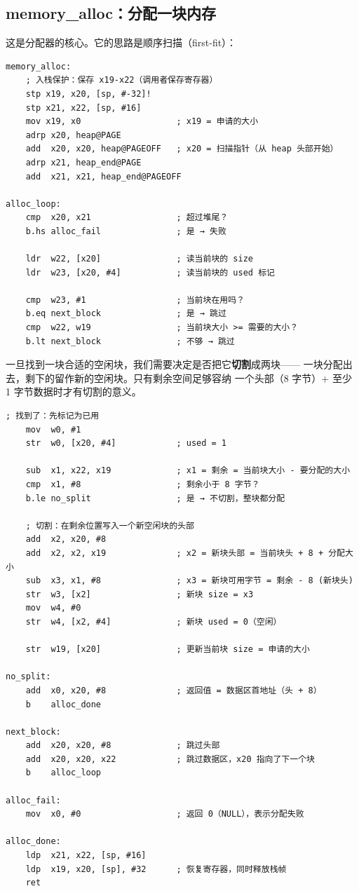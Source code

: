 \subsection{memory\_alloc：分配一块内存}

这是分配器的核心。它的思路是顺序扫描（first-fit）：

\begin{lstlisting}[style=asm,caption=memory.s — memory\_alloc（第一部分：扫描循环）]
memory_alloc:
    ; 入栈保护：保存 x19-x22（调用者保存寄存器）
    stp x19, x20, [sp, #-32]!
    stp x21, x22, [sp, #16]
    mov x19, x0                   ; x19 = 申请的大小
    adrp x20, heap@PAGE
    add  x20, x20, heap@PAGEOFF   ; x20 = 扫描指针（从 heap 头部开始）
    adrp x21, heap_end@PAGE
    add  x21, x21, heap_end@PAGEOFF

alloc_loop:
    cmp  x20, x21                 ; 超过堆尾？
    b.hs alloc_fail               ; 是 → 失败

    ldr  w22, [x20]               ; 读当前块的 size
    ldr  w23, [x20, #4]           ; 读当前块的 used 标记

    cmp  w23, #1                  ; 当前块在用吗？
    b.eq next_block               ; 是 → 跳过
    cmp  w22, w19                 ; 当前块大小 >= 需要的大小？
    b.lt next_block               ; 不够 → 跳过
\end{lstlisting}

一旦找到一块合适的空闲块，我们需要决定是否把它\textbf{切割}成两块——
一块分配出去，剩下的留作新的空闲块。只有剩余空间足够容纳
一个头部（8 字节）+ 至少 1 字节数据时才有切割的意义。

\begin{lstlisting}[style=asm,caption=memory.s — memory\_alloc（第二部分：分配与切割）]
    ; 找到了：先标记为已用
    mov  w0, #1
    str  w0, [x20, #4]            ; used = 1

    sub  x1, x22, x19             ; x1 = 剩余 = 当前块大小 - 要分配的大小
    cmp  x1, #8                   ; 剩余小于 8 字节？
    b.le no_split                 ; 是 → 不切割，整块都分配

    ; 切割：在剩余位置写入一个新空闲块的头部
    add  x2, x20, #8
    add  x2, x2, x19              ; x2 = 新块头部 = 当前块头 + 8 + 分配大小
    sub  x3, x1, #8               ; x3 = 新块可用字节 = 剩余 - 8 (新块头)
    str  w3, [x2]                 ; 新块 size = x3
    mov  w4, #0
    str  w4, [x2, #4]             ; 新块 used = 0（空闲）

    str  w19, [x20]               ; 更新当前块 size = 申请的大小

no_split:
    add  x0, x20, #8              ; 返回值 = 数据区首地址（头 + 8）
    b    alloc_done

next_block:
    add  x20, x20, #8             ; 跳过头部
    add  x20, x20, x22            ; 跳过数据区，x20 指向了下一个块
    b    alloc_loop

alloc_fail:
    mov  x0, #0                   ; 返回 0（NULL），表示分配失败

alloc_done:
    ldp  x21, x22, [sp, #16]
    ldp  x19, x20, [sp], #32      ; 恢复寄存器，同时释放栈帧
    ret
\end{lstlisting}

